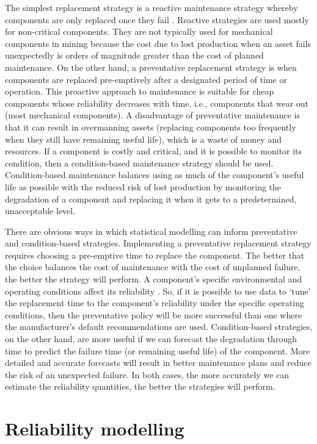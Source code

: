The simplest replacement strategy is a reactive maintenance strategy whereby components are only replaced once they fail \citep{heng2009}. Reactive strategies are used mostly for non-critical components. They are not typically used for mechanical components in mining because the cost due to lost production when an asset fails unexpectedly is orders of magnitude greater than the cost of planned maintenance. On the other hand, a preventative replacement strategy is when components are replaced pre-emptively after a designated period of time or operation. This proactive approach to maintenance is suitable for cheap components whose reliability decreases with time, i.e., components that wear out (most mechanical components). A disadvantage of preventative maintenance is that it can result in overmanning assets (replacing components too frequently when they still have remaining useful life), which is a waste of money and resources. If a component is costly and critical, and it is possible to monitor its condition, then a condition-based maintenance strategy should be used. Condition-based maintenance balances using as much of the component's useful life as possible with the reduced risk of lost production by monitoring the degradation of a component and replacing it when it gets to a predetermined, unacceptable level.

There are obvious ways in which statistical modelling can inform preventative and condition-based strategies. Implementing a preventative replacement strategy requires choosing a pre-emptive time to replace the component. The better that the choice balances the cost of maintenance with the cost of unplanned failure, the better the strategy will perform. A component's specific environmental and operating conditions affect its reliability \citep{Meeker2022}. So, if it is possible to use data to `tune' the replacement time to the component's reliability under the specific operating conditions, then the preventative policy will be more successful than one where the manufacturer's default recommendations are used. Condition-based strategies, on the other hand, are more useful if we can forecast the degradation through time to predict the failure time (or remaining useful life) of the component. More detailed and accurate forecasts will result in better maintenance plans and reduce the risk of an unexpected failure. In both cases, the more accurately we can estimate the reliability quantities, the better the strategies will perform.

\section{Reliability modelling}
\label{sec:reliability}


